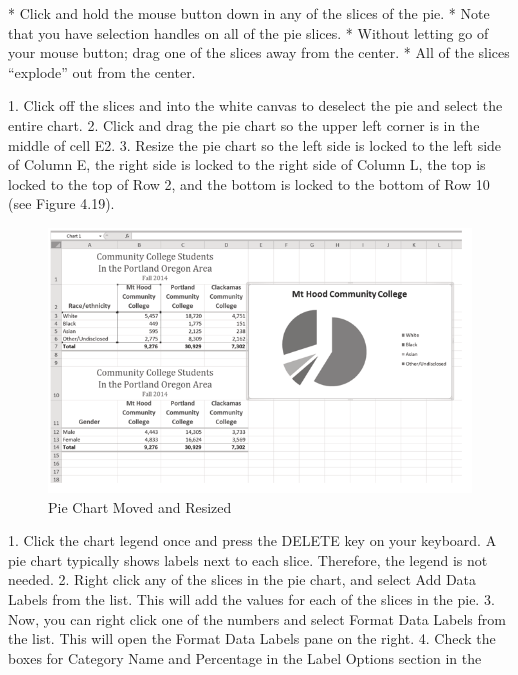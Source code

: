 * Click and hold the mouse button down in any of the slices of the pie.
* Note that you have selection handles on all of the pie slices.
* Without letting go of your mouse button; drag one of the slices away from the center.
* All of the slices “explode” out from the center.



1. Click off the slices and into the white canvas to deselect the pie and select the entire chart.
2. Click and drag the pie chart so the upper left corner is in the middle of cell E2.
3. Resize the pie chart so the left side is locked to the left side of Column E, the right side is locked
to the right side of Column L, the top is locked to the top of Row 2, and the bottom is locked to
the bottom of Row 10 (see Figure 4.19).



\begin{figure}[H]
	\centering
	\includegraphics[width=\maxwidth{.95\linewidth}]{gfx/ch04_fig22}
	\caption{Pie Chart Moved and Resized}
	\label{04:fig22}
\end{figure}




1. Click the chart legend once and press the DELETE key on your keyboard. A pie chart typically
shows labels next to each slice. Therefore, the legend is not needed.
2. Right click any of the slices in the pie chart, and select Add Data Labels from the list. This will
add the values for each of the slices in the pie.
3. Now, you can right click one of the numbers and select Format Data Labels from the list. This
will open the Format Data Labels pane on the right.
4. Check the boxes for Category Name and Percentage in the Label Options section in the





